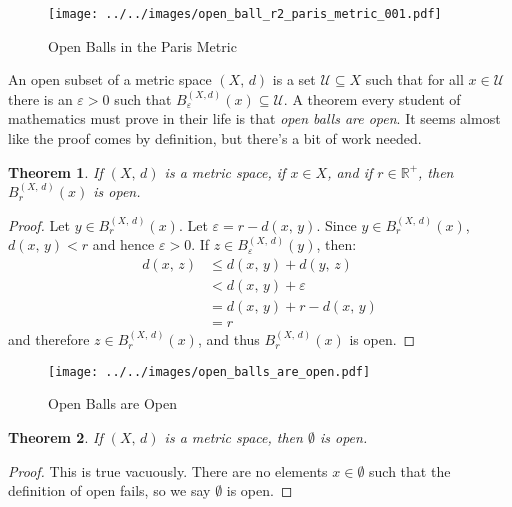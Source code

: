 \documentclass{article}
\theoremstyle{plain}
\newtheorem{theorem}{Theorem}[section]
\theoremstyle{normal}
\newenvironment{definition}{%
    \pushQED{\qed}\renewcommand{\qedsymbol}{$\blacksquare$}\definitionx%
}{%
    \popQED\enddefinitionx%
}
\begin{document}
        \begin{figure}
            \centering
            \texttt{[image: ../../images/open\_ball\_r2\_paris\_metric\_001.pdf]}
            \caption{Open Balls in the Paris Metric}
            \label{fig:open_ball_r2_paris_metric_001}
        \end{figure}
        \begin{definition}[\textbf{Open Subsets}]
            An open subset of a metric space $(X,\,d)$ is a set
            $\mathcal{U}\subseteq{X}$ such that for all
            $x\in\mathcal{U}$ there is an $\varepsilon>0$ such that
            $B_{\varepsilon}^{(X,d)}(x)\subseteq\mathcal{U}$.
        \end{definition}
        A theorem every student of mathematics must prove in their life
        is that \textit{open balls are open}. It seems almost like the proof
        comes by definition, but there's a bit of work needed.
        \begin{theorem}
            If $(X,\,d)$ is a metric space, if $x\in{X}$, and if
            $r\in\mathbb{R}^{+}$, then $B_{r}^{(X,\,d)}(x)$ is open.
        \end{theorem}
        \begin{proof}
            Let $y\in{B}_{r}^{(X,\,d)}(x)$. Let
            $\varepsilon=r-d(x,\,y)$. Since
            $y\in{B}_{r}^{(X,\,d)}(x)$, $d(x,\,y)<r$ and hence
            $\varepsilon>0$. If
            $z\in{B}_{\varepsilon}^{(X,\,d)}(y)$, then:
            \begin{align}
                d(x,\,z)&\leq{d}(x,\,y)+d(y,\,z)\\
                    &<d(x,\,y)+\varepsilon\\
                    &=d(x,\,y)+r-d(x,\,y)\\
                    &=r
            \end{align}
            and therefore $z\in{B}_{r}^{(X,\,d)}(x)$, and thus
            $B_{r}^{(X,\,d)}(x)$ is open.
        \end{proof}
        \begin{figure}
            \centering
            \texttt{[image: ../../images/open\_balls\_are\_open.pdf]}
            \caption{Open Balls are Open}
            \label{fig:open_balls_are_open}
        \end{figure}
        \begin{theorem}
            If $(X,\,d)$ is a metric space, then $\emptyset$ is open.
        \end{theorem}
        \begin{proof}
            This is true vacuously. There are no elements
            $x\in\emptyset$ such that the definition of open fails, so
            we say $\emptyset$ is open.
        \end{proof}
\end{document}
